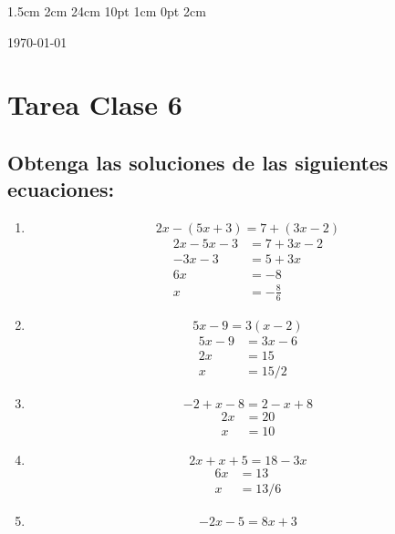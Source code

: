 \documentclass[12pt,letterpaper]{report}
\begin{document}
\setmargins{2.5cm}      
{1.5cm}                     
{2cm}  
{24cm}                    
{10pt}                          
{1cm}                          
{0pt}                             
{2cm}
\begin{flushright}
\today
\end{flushright}
\vspace{-1.75cm}
\section*{Tarea Clase 6}
\subsection*{Obtenga las soluciones de las siguientes ecuaciones:}
\begin{enumerate}
\item \begin{equation*}
    2x-(5x+3)=7+(3x-2)
\end{equation*}
\begin{align*}
    2x-5x-3&=7+3x-2\\
    -3x-3&=5+3x\\
    6x&=-8\\
    x&=-\frac{8}{6}
\end{align*}
\item \begin{equation*}
    5x-9=3(x-2)
\end{equation*}
\begin{align*}
    5x-9&=3x-6\\
    2x&=15\\
    x&=15/2
\end{align*}
\item \begin{equation*}
    -2+x-8=2-x+8
\end{equation*}
\begin{align*}
    2x&=20\\
    x&=10
\end{align*}
\item \begin{equation*}
    2x+x+5=18-3x
\end{equation*}
\begin{align*}
    6x&=13\\
    x&=13/6
\end{align*}
\item \begin{equation*}
    -2x-5=8x+3
\end{equation*}

\end{enumerate}
\end{document}
